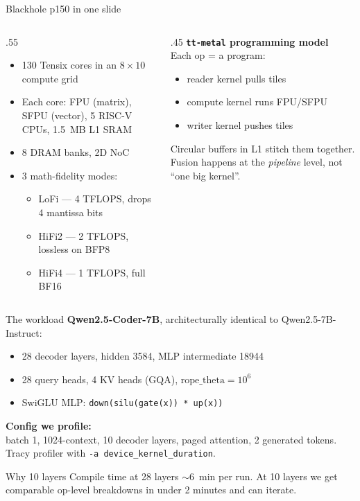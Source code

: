 \documentclass[aspectratio=169,10pt]{beamer}
\begin{document}
\begin{frame}{Blackhole p150 in one slide}
  \begin{columns}[T,onlytextwidth]
    \begin{column}{.55\textwidth}
      \begin{itemize}
        \item 130 Tensix cores in an $8{\times}10$ compute grid
        \item Each core: FPU (matrix), SFPU (vector), 5 RISC-V CPUs,
              1.5~MB L1 SRAM
        \item 8 DRAM banks, 2D NoC
        \item 3 math-fidelity modes:
          \begin{itemize}
            \item LoFi — 4 TFLOPS, drops 4 mantissa bits
            \item HiFi2 — 2 TFLOPS, lossless on BFP8
            \item HiFi4 — 1 TFLOPS, full BF16
          \end{itemize}
      \end{itemize}
    \end{column}
    \begin{column}{.45\textwidth}
      \small
      \textbf{\texttt{tt-metal} programming model}\\[0.3em]
      Each op = a program:
      \begin{itemize}\small
        \item reader kernel pulls tiles
        \item compute kernel runs FPU/SFPU
        \item writer kernel pushes tiles
      \end{itemize}
      Circular buffers in L1 stitch them together. Fusion happens at
      the \emph{pipeline} level, not ``one big kernel''.
    \end{column}
  \end{columns}
\end{frame}

\begin{frame}{The workload}
  \textbf{Qwen2.5-Coder-7B}, architecturally identical to Qwen2.5-7B-Instruct:
  \begin{itemize}
    \item 28 decoder layers, hidden 3584, MLP intermediate 18944
    \item 28 query heads, 4 KV heads (GQA), $\mathrm{rope\_theta}=10^{6}$
    \item SwiGLU MLP: \texttt{down(silu(gate(x)) * up(x))}
  \end{itemize}
  \vfill
  \textbf{Config we profile:} \\
  batch 1, 1024-context, 10 decoder layers, paged attention, 2 generated
  tokens. Tracy profiler with
  \texttt{-a device\_kernel\_duration}.
  \vfill
  \begin{alertblock}{Why 10 layers}
    Compile time at 28 layers $\sim$6~min per run. At 10 layers we get
    comparable op-level breakdowns in under 2 minutes and can iterate.
  \end{alertblock}
\end{frame}
\end{document}
